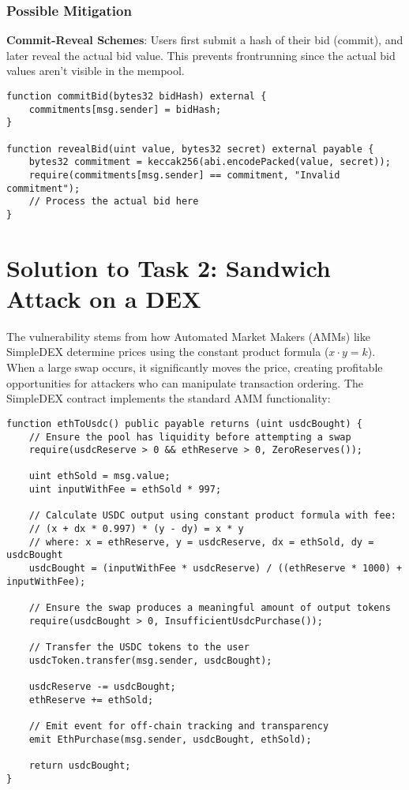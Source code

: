 \documentclass[12pt]{article}
\begin{document}
\subsubsection*{Possible Mitigation}

\textbf{Commit-Reveal Schemes}: Users first submit a hash of their bid (commit), and later reveal the actual bid value. This prevents frontrunning since the actual bid values aren't visible in the mempool.

\noindent
\begin{minipage}{\textwidth}
\begin{lstlisting}[language=Solidity]
function commitBid(bytes32 bidHash) external {
    commitments[msg.sender] = bidHash;
}

function revealBid(uint value, bytes32 secret) external payable {
    bytes32 commitment = keccak256(abi.encodePacked(value, secret));
    require(commitments[msg.sender] == commitment, "Invalid commitment");
    // Process the actual bid here
}
\end{lstlisting}
\end{minipage}

\section*{Solution to Task 2: Sandwich Attack on a DEX}

The vulnerability stems from how Automated Market Makers (AMMs) like SimpleDEX determine prices using the constant product formula ($x \cdot y = k$). When a large swap occurs, it significantly moves the price, creating profitable opportunities for attackers who can manipulate transaction ordering. The SimpleDEX contract implements the standard AMM functionality:

\noindent
\begin{minipage}{\textwidth}
\begin{lstlisting}[language=Solidity]
function ethToUsdc() public payable returns (uint usdcBought) {
    // Ensure the pool has liquidity before attempting a swap
    require(usdcReserve > 0 && ethReserve > 0, ZeroReserves());

    uint ethSold = msg.value;
    uint inputWithFee = ethSold * 997;

    // Calculate USDC output using constant product formula with fee: 
    // (x + dx * 0.997) * (y - dy) = x * y
    // where: x = ethReserve, y = usdcReserve, dx = ethSold, dy = usdcBought
    usdcBought = (inputWithFee * usdcReserve) / ((ethReserve * 1000) + inputWithFee);

    // Ensure the swap produces a meaningful amount of output tokens
    require(usdcBought > 0, InsufficientUsdcPurchase());

    // Transfer the USDC tokens to the user
    usdcToken.transfer(msg.sender, usdcBought);

    usdcReserve -= usdcBought;
    ethReserve += ethSold;

    // Emit event for off-chain tracking and transparency
    emit EthPurchase(msg.sender, usdcBought, ethSold);

    return usdcBought;
}
\end{lstlisting}
\end{minipage}
\end{document}
